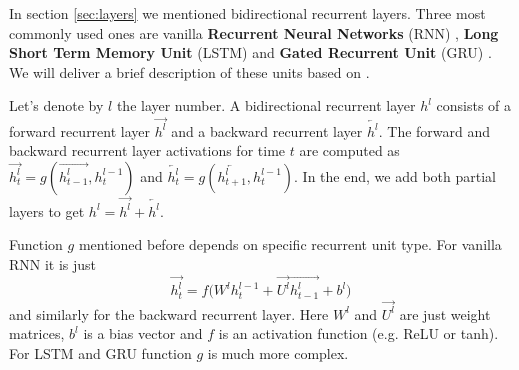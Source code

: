 \documentclass[licencjacka,en]{pracamgr}
\begin{document}
	In section \ref{sec:layers} we mentioned bidirectional recurrent layers. Three most commonly used ones are vanilla \textbf{Recurrent Neural Networks} (RNN) \cite{RNN}, \textbf{Long Short Term Memory Unit} (LSTM) \cite{LSTM} and \textbf{Gated Recurrent Unit} (GRU) \cite{GRU}. We will deliver a brief description of these units based on \cite{DS2}.
	
	Let's denote by $l$ the layer number. A bidirectional recurrent layer $h^l$ consists of a forward recurrent layer $\overrightarrow{h^l}$ and a backward recurrent layer $\overleftarrow{h^l}$. The forward and backward recurrent layer activations for time $t$ are computed as $\overrightarrow{h^l_t} = g(\overrightarrow{h^l_{t - 1}}, h^{l-1}_t)$ and $\overleftarrow{h^l_t} = g(\overleftarrow{h^l_{t+1}}, h^{l-1}_t)$. In the end, we add both partial layers to get $h^l = \overrightarrow{h^l} + \overleftarrow{h^l}$.
	
	Function $g$ mentioned before depends on specific recurrent unit type. For vanilla RNN it is just
	$$\overrightarrow{h^l_t} = f\big(W^l h^{l-1}_t + \overrightarrow{U^l} \overrightarrow{h^l_{t - 1}} + b^l\big)$$
	and similarly for the backward recurrent layer. Here $W^l$ and $\overrightarrow{U^l}$ are just weight matrices, $b^l$ is a bias vector and $f$ is an activation function (e.g. ReLU or tanh). For LSTM and GRU function $g$ is much more complex.
	
	\noindent%
	\begin{minipage}{\linewidth}%
		\label{fig:gru}		     
	\end{minipage}
	
\end{document}
